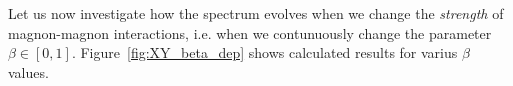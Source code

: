 \documentclass[12pt, a4paper]{article}
\begin{document}
Let us now investigate how the spectrum evolves when we change the \textit{strength} of magnon-magnon interactions, i.e. when we contunuously change the parameter $\beta \in [0,1]$. Figure~\ref{fig:XY_beta_dep} shows calculated results for varius $\beta$ values.
\begin{figure}
	\centering
	\\
	\\
\end{figure}
\end{document}
